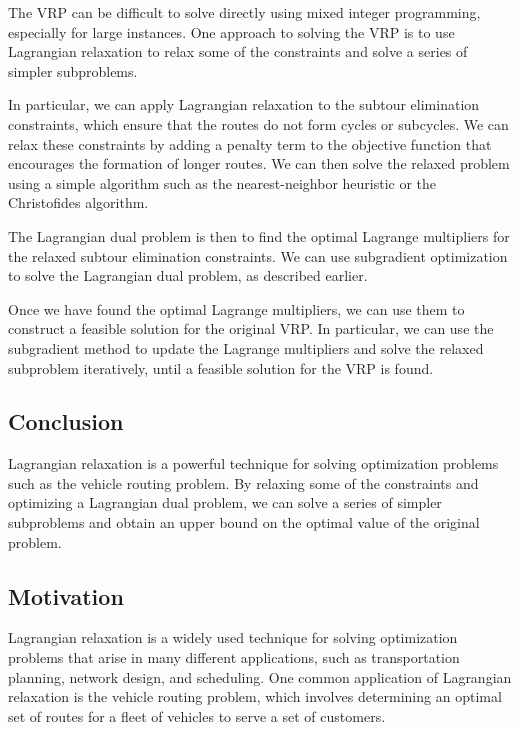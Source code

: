The VRP can be difficult to solve directly using mixed integer programming, especially for large instances. One approach to solving the VRP is to use Lagrangian relaxation to relax some of the constraints and solve a series of simpler subproblems.

In particular, we can apply Lagrangian relaxation to the subtour elimination constraints, which ensure that the routes do not form cycles or subcycles. We can relax these constraints by adding a penalty term to the objective function that encourages the formation of longer routes. We can then solve the relaxed problem using a simple algorithm such as the nearest-neighbor heuristic or the Christofides algorithm.

The Lagrangian dual problem is then to find the optimal Lagrange multipliers for the relaxed subtour elimination constraints. We can use subgradient optimization to solve the Lagrangian dual problem, as described earlier.

Once we have found the optimal Lagrange multipliers, we can use them to construct a feasible solution for the original VRP. In particular, we can use the subgradient method to update the Lagrange multipliers and solve the relaxed subproblem iteratively, until a feasible solution for the VRP is found.

\subsection{Conclusion}

Lagrangian relaxation is a powerful technique for solving optimization problems such as the vehicle routing problem. By relaxing some of the constraints and optimizing a Lagrangian dual problem, we can solve a series of simpler subproblems and obtain an upper bound on the optimal value of the original problem.



\subsection{Motivation}

Lagrangian relaxation is a widely used technique for solving optimization problems that arise in many different applications, such as transportation planning, network design, and scheduling. One common application of Lagrangian relaxation is the vehicle routing problem, which involves determining an optimal set of routes for a fleet of vehicles to serve a set of customers.

